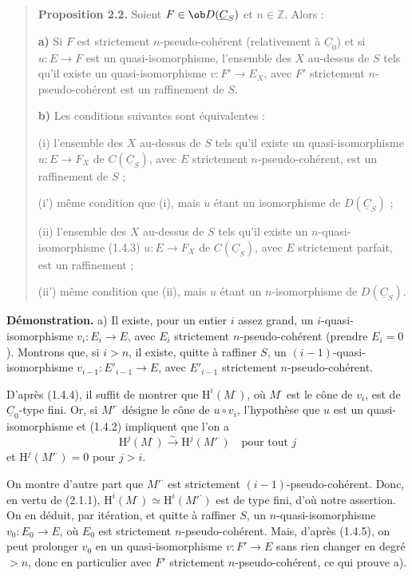 \begin{quote}
\textbf{Proposition 2.2.} Soient $F \in \ob D(\underline{C}_S)$ et $n \in \mathbb{Z}$. Alors :

\textbf{a)} Si $F$ est strictement $n$-pseudo-cohérent (relativement à $\underline{C}_0$) et si $u : E \to F$ est un quasi-isomorphisme, l'ensemble des $X$ au-dessus de $S$ tels qu'il existe un quasi-isomorphisme $v : F' \to E_X$, avec $F'$ strictement $n$-pseudo-cohérent est un raffinement de $S$.

\textbf{b)} Les conditions suivantes sont équivalentes :

\quad\textup{(i)} l'ensemble des $X$ au-dessus de $S$ tels qu'il existe un quasi-isomorphisme $u : E \to F_X$ de $C(\underline{C}_S)$, avec $E$ strictement $n$-pseudo-cohérent, est un raffinement de $S$ ;

\quad\textup{(i')} même condition que (i), mais $u$ étant un isomorphisme de $D(\underline{C}_S)$ ;

\quad\textup{(ii)} l'ensemble des $X$ au-dessus de $S$ tels qu'il existe un $n$-quasi-isomorphisme (1.4.3) $u : E \to F_X$ de $C(\underline{C}_S)$, avec $E$ strictement parfait, est un raffinement ;

\quad\textup{(ii')} même condition que (ii), mais $u$ étant un $n$-isomorphisme de $D(\underline{C}_S)$.
\end{quote}

\textbf{Démonstration.} a) Il existe, pour un entier $i$ assez grand, un $i$-quasi-isomorphisme $v_i : E_i \to E$, avec $E_i$ strictement $n$-pseudo-cohérent (prendre $E_i = 0$). Montrons que, si $i > n$, il existe, quitte à raffiner $S$, un $(i-1)$-quasi-isomorphisme $v_{i-1} : E'_{i-1} \to E$, avec $E'_{i-1}$ strictement $n$-pseudo-cohérent.

D'après (1.4.4), il suffit de montrer que $\mathrm{H}^i(M^\cdot)$, où $M^\cdot$ est le cône de $v_i$, est de $\underline{C}_0$-type fini. Or, si $M'^\cdot$ désigne le cône de $u \circ v_i$, l'hypothèse que $u$ est un quasi-isomorphisme et (1.4.2) impliquent que l'on a
\[
\mathrm{H}^j(M^\cdot) \xrightarrow{\sim} \mathrm{H}^j(M'^\cdot) \quad \text{pour tout } j
\]
et $\mathrm{H}^j(M'^\cdot) = 0$ pour $j > i$.

On montre d'autre part que $M'^\cdot$ est strictement $(i-1)$-pseudo-cohérent. Donc, en vertu de (2.1.1), $\mathrm{H}^i(M^\cdot) \simeq \mathrm{H}^i(M'^\cdot)$ est de type fini, d'où notre assertion. On en déduit, par itération, et quitte à raffiner $S$, un $n$-quasi-isomorphisme $v_0 : E_0 \to E$, où $E_0$ est strictement $n$-pseudo-cohérent. Mais, d'après (1.4.5), on peut prolonger $v_0$ en un quasi-isomorphisme $v : F' \to E$ sans rien changer en degré $> n$, donc en particulier avec $F'$ strictement $n$-pseudo-cohérent, ce qui prouve a).

